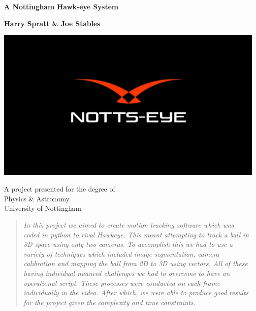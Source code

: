 \documentclass{article}
\begin{document}
\begin{titlepage}
   \begin{center}
       \vspace*{1cm}

       \textbf{A Nottingham Hawk-eye System}

       \vspace{0.5cm}
            
       \vspace{1.5cm}

       \textbf{Harry Spratt \& Joe Stables}
       
       \vspace{5cm}
       
       \includegraphics[width=1\textwidth]{logojpeg.jpg}
       
       \vspace{5cm}
       
       A project presented for the degree of\\
              
             
       Physics \& Astronomy\\
       University of Nottingham\\
            
   \end{center}
\end{titlepage}

\begin{abstract}

\emph{
In this project we aimed to create motion tracking software which was coded in python to rival Hawkeye. This meant attempting to track a ball in 3D space using only two cameras. To accomplish this we had to use a variety of techniques which included image segmentation, camera calibration and mapping the ball from 2D to 3D using vectors. All of these having individual nuanced challenges we had to overcome to have an operational script. These processes were conducted on each frame individually in the video. After which, we were able to produce good results for the project given the complexity and time constraints.\\
}
\end{abstract}
\end{document}
